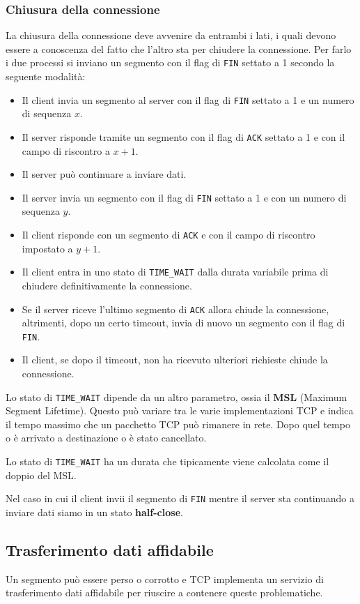 \subsubsection{Chiusura della connessione}
La chiusura della connessione deve avvenire da entrambi i lati, i quali
devono essere a conoscenza del fatto che l'altro sta per chiudere la 
connessione. Per farlo i due processi si inviano un segmento con il 
flag di \verb|FIN| settato a 1 secondo la seguente modalità:
\begin{itemize}
	\item Il client invia un segmento al server con il flag di 
		\verb|FIN| settato a 1 e un numero di sequenza $x$.
	\item Il server risponde tramite un segmento con il flag di 
		\verb|ACK| settato a 1 e con il campo di riscontro a $x+1$.
	\item Il server può continuare a inviare dati.
	\item Il server invia un segmento con il flag di \verb|FIN| settato
		a 1 e con un numero di sequenza $y$.
	\item Il client risponde con un segmento di \verb|ACK| e con il 
		campo di riscontro impostato a $y+1$.
	\item Il client entra in uno stato di \verb|TIME_WAIT| dalla durata
		variabile prima di chiudere definitivamente la connessione.
	\item Se il server riceve l'ultimo segmento di \verb|ACK| allora 
		chiude la connessione, altrimenti, dopo un certo timeout, invia
		di nuovo un segmento con il flag di \verb|FIN|.
	\item Il client, se dopo il timeout, non ha ricevuto ulteriori 
		richieste chiude la connessione.
\end{itemize}
Lo stato di \verb|TIME_WAIT| dipende da un altro parametro, ossia il 
\textbf{MSL} (Maximum Segment Lifetime). Questo può variare tra le 
varie implementazioni TCP e indica il tempo massimo che un pacchetto 
TCP può rimanere in rete. Dopo quel tempo o è arrivato a destinazione o
è stato cancellato.

Lo stato di \verb|TIME_WAIT| ha un durata che tipicamente viene 
calcolata come il doppio del MSL.

Nel caso in cui il client invii il segmento di \verb|FIN| mentre il 
server sta continuando a inviare dati siamo in un stato 
\textbf{half-close}.

\subsection{Trasferimento dati affidabile}
Un segmento può essere perso o corrotto e TCP implementa un servizio di
trasferimento dati affidabile per riuscire a contenere queste 
problematiche.

